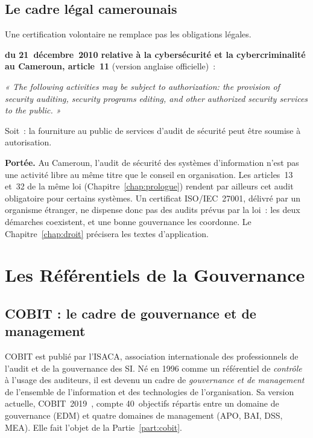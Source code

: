 \subsection{Le cadre légal camerounais}

Une certification volontaire ne remplace pas les obligations légales.

\begin{boxjuris}
\textbf{ du 21~décembre~2010 relative à la
cybersécurité et la cybercriminalité au Cameroun, article~11} (version
anglaise officielle)~:

\medskip
\textit{« The following activities may be subject to authorization:
\textelp{} the provision of security auditing, security programs editing,
and other authorized security services to the public. »}

\medskip
Soit~: la fourniture au public de services d'audit de sécurité peut être
soumise à autorisation.

\medskip
\textbf{Portée.} Au Cameroun, l'audit de sécurité des systèmes
d'information n'est pas une activité libre au même titre que le conseil
en organisation. Les articles~13 et~32 de la même loi
(Chapitre~\ref{chap:prologue}) rendent par ailleurs cet audit obligatoire
pour certains systèmes. Un certificat ISO/IEC~27001, délivré par un
organisme étranger, ne dispense donc pas des audits prévus par la loi~:
les deux démarches coexistent, et une bonne gouvernance les coordonne. Le
Chapitre~\ref{chap:droit} précisera les textes d'application.
\end{boxjuris}

\section{Les Référentiels de la Gouvernance}
\label{sec:c04-gouvernance}

\subsection{COBIT : le cadre de gouvernance et de management}

COBIT est publié par l'ISACA, association internationale des
professionnels de l'audit et de la gouvernance des SI. Né en 1996 comme
un référentiel de \emph{contrôle} à l'usage des auditeurs, il est devenu
un cadre de \emph{gouvernance et de management} de l'ensemble de
l'information et des technologies de l'organisation. Sa version
actuelle, COBIT~2019~\cite{isaca2018cobitintro}, compte 40~objectifs
répartis entre un domaine de gouvernance (EDM) et quatre domaines de
management (APO, BAI, DSS, MEA). Elle fait l'objet de la
Partie~\ref{part:cobit}.

